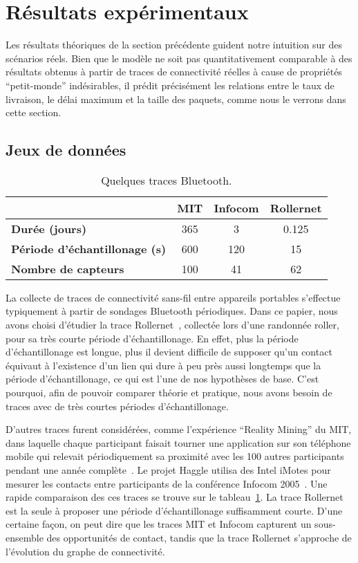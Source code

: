 \documentclass{article-cfip}
\begin{document}
{\section{Résultats expérimentaux}
\label{sec:experimental}

Les résultats théoriques de la section précédente guident notre
intuition sur des scénarios réels. Bien que le modèle ne soit pas
quantitativement comparable à des résultats obtenus à partir de traces
de connectivité réelles à cause de propriétés ``petit-monde''
indésirables, il prédit précisément les relations entre le taux de
livraison, le délai maximum et la taille des paquets, comme nous le
verrons dans cette section.

\subsection{Jeux de données}
\label{datasets}

\begin{table}[t]
  \centering
\caption{Quelques traces Bluetooth.}
\begin{tabular}{lccc}
& \textbf{MIT} & \textbf{Infocom} & \textbf{Rollernet} \\
  \hline
  \textbf{Durée (jours)}    & 365     & 3              & 0.125 \\
  \textbf{Période d'échantillonage (s)}& 600     & 120     & 15 \\
  \textbf{Nombre de capteurs}            & 100    & 41              & 62 \\
  \hline
\end{tabular}
  \label{blue}
\end{table}

La collecte de traces de connectivité sans-fil entre appareils
portables s'effectue typiquement à partir de sondages Bluetooth
périodiques. Dans ce papier, nous avons choisi d'étudier la trace
Rollernet~\cite{tournoux08_rollernet}, collectée lors d'une randonnée
roller, pour sa très courte période d'échantillonage. En effet, plus
la période d'échantillonage est longue,
plus il devient difficile de supposer qu'un contact équivaut à
l'existence d'un lien qui dure à peu près aussi longtemps que la
période d'échantillonage, ce qui est l'une de nos hypothèses de
base. C'est pourquoi, afin de pouvoir comparer théorie et pratique,
nous avons besoin de traces avec de très courtes périodes
d'échantillonage.

D'autres traces furent considérées, comme l'expérience ``Reality
Mining'' du MIT, dans laquelle chaque participant faisait tourner une
application sur son téléphone mobile qui relevait périodiquement sa
proximité avec les 100 autres participants pendant une année
complète~\cite{mit}. Le projet Haggle utilisa des Intel iMotes pour
mesurer les contacts entre participants de la conférence Infocom
2005~\cite{chaintreau_mobility}. Une rapide comparaison des ces traces
se trouve sur le tableau~\ref{blue}. La trace Rollernet est la seule à
proposer une période d'échantillonage suffisamment courte. D'une
certaine façon, on peut dire que les traces MIT et Infocom capturent
un sous-ensemble des opportunités de contact, tandis que la trace
Rollernet s'approche de l'évolution du graphe de connectivité.

}
\end{document}

